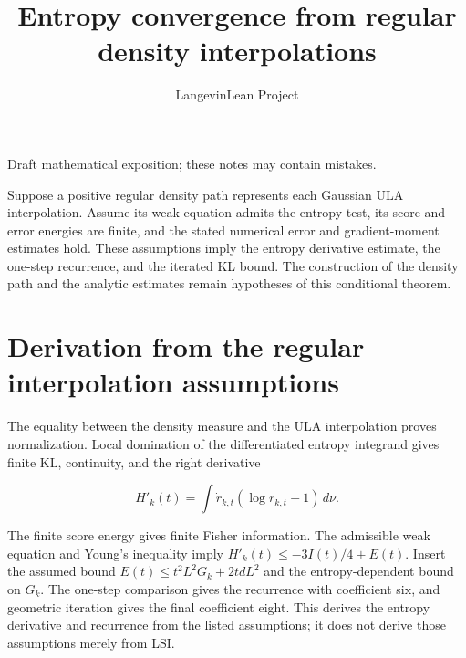 \documentclass[11pt,a4paper]{article}
\title{\texorpdfstring{Entropy convergence from regular density interpolations}{Entropy convergence from regular density interpolations}}
\author{LangevinLean Project}
\date{}
\begin{document}
\maketitle
Draft mathematical exposition; these notes may contain mistakes.


Suppose a positive regular density path represents each Gaussian ULA interpolation. Assume its weak equation admits the entropy test, its score and error energies are finite, and the stated numerical error and gradient-moment estimates hold. These assumptions imply the entropy derivative estimate, the one-step recurrence, and the iterated KL bound. The construction of the density path and the analytic estimates remain hypotheses of this conditional theorem.


\section{\texorpdfstring{Derivation from the regular interpolation assumptions}{Derivation from the regular interpolation assumptions}}


The equality between the density measure and the ULA interpolation proves normalization. Local domination of the differentiated entropy integrand gives finite KL, continuity, and the right derivative

\[H'_k(t)=\int\dot r_{k,t}(\log r_{k,t}+1)\,d\nu.\]

The finite score energy gives finite Fisher information. The admissible weak equation and Young's inequality imply \(H'_k(t)\le-3I(t)/4+E(t)\). Insert the assumed bound \(E(t)\le t^2L^2G_k+2tdL^2\) and the entropy-dependent bound on \(G_k\). The one-step comparison gives the recurrence with coefficient six, and geometric iteration gives the final coefficient eight. This derives the entropy derivative and recurrence from the listed assumptions; it does not derive those assumptions merely from LSI.
\end{document}
